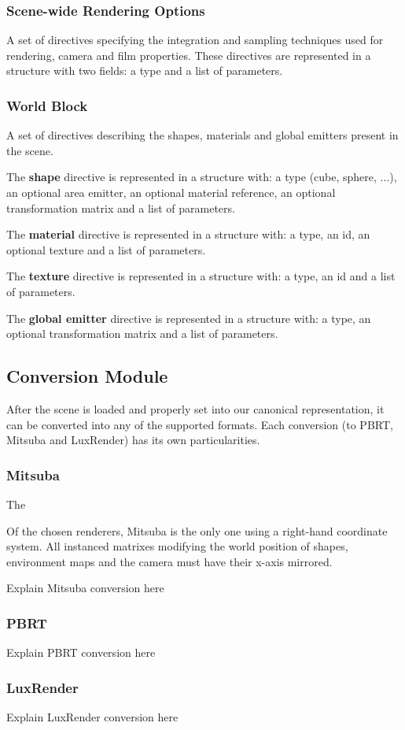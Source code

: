 \subsubsection{Scene-wide Rendering Options}
A set of directives specifying the integration and sampling techniques used for 
rendering, camera and film properties. These directives are represented in a 
structure with two fields: a type and a list of parameters.

\subsubsection{World Block}
A set of directives describing the shapes, materials and global emitters present 
in the scene. 

The \textbf{shape} directive is represented in a structure with: a type (cube, 
sphere, ...), an optional area emitter, an optional material reference, an 
optional transformation matrix and a list of parameters. 

The \textbf{material} directive is represented in a structure with: a type, an 
id, an optional texture and a list of parameters.

The \textbf{texture} directive is represented in a structure with: a type, an id 
and a list of parameters.

The \textbf{global emitter} directive is represented in a structure with: a 
type, an optional transformation matrix and a list of parameters.

\subsection{Conversion Module}
After the scene is loaded and properly set into our canonical representation, it 
can be converted into any of the supported formats. Each conversion (to PBRT, 
Mitsuba and LuxRender) has its own particularities.

\subsubsection{Mitsuba}
The

Of the chosen renderers, Mitsuba is the only one using a right-hand coordinate 
system. All instanced matrixes modifying the world position of shapes, 
environment maps and the camera must have their x-axis mirrored. 

Explain Mitsuba conversion here


\subsubsection{PBRT}
Explain PBRT conversion here

\subsubsection{LuxRender}
Explain LuxRender conversion here